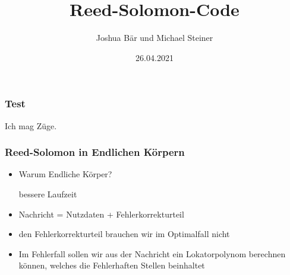 \documentclass[11pt,aspectratio=169]{beamer}
\begin{document}
	\author{Joshua Bär und Michael Steiner}
	\title{Reed-Solomon-Code}
	\subtitle{}
	\logo{}
	\date{26.04.2021}
	\subject{Mathematisches Seminar}
	\begin{frame}[plain]
		\maketitle
	\end{frame}
	\begin{frame}
		\frametitle{Test}
		Ich mag Züge.
	\end{frame}

	\begin{frame}
		\frametitle{Reed-Solomon in Endlichen Körpern}
		
		\begin{itemize}
			\item Warum Endliche Körper?
			
			\qquad bessere Laufzeit
			
			\vspace{10pt}
			
			\item Nachricht = Nutzdaten + Fehlerkorrekturteil
			
			\vspace{10pt}
			
			\item den Fehlerkorrekturteil brauchen wir im Optimalfall nicht
			
			\vspace{10pt}
			
			\item Im Fehlerfall sollen wir aus der Nachricht ein Lokatorpolynom berechnen können, welches die Fehlerhaften Stellen beinhaltet
			
						
		\end{itemize}
		
		
		
		
	\end{frame}
\end{document}
